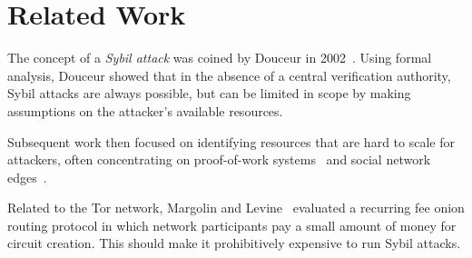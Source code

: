 \section{Related Work}
\label{sec:related_work}
The concept of a \emph{Sybil attack} was coined by Douceur in
2002~\cite{Douceur2002a}.  Using formal analysis, Douceur showed that in the
absence of a central verification authority, Sybil attacks are always possible,
but can be limited in scope by making assumptions on the attacker's available
resources.

Subsequent work then focused on identifying resources that are hard to scale
for attackers, often concentrating on proof-of-work
systems~\cite{Li2012a,Borisov2006a} and social network
edges~\cite{Danezis2009a,Yu2006a}.

Related to the Tor network, Margolin and Levine~\cite{Margolin2008a} evaluated
a recurring fee onion routing protocol in which network participants pay a
small amount of money for circuit creation.  This should make it prohibitively
expensive to run Sybil attacks.
